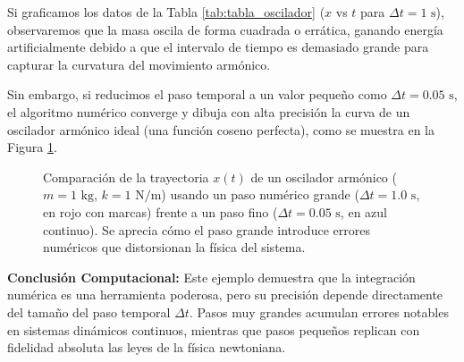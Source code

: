 \documentclass[11pt,a4paper]{book}
\begin{document}
Si graficamos los datos de la Tabla \ref{tab:tabla_oscilador} ($x$ vs $t$ para $\Delta t = 1 \text{ s}$), observaremos que la masa oscila de forma cuadrada o errática, ganando energía artificialmente debido a que el intervalo de tiempo es demasiado grande para capturar la curvatura del movimiento armónico. 

Sin embargo, si reducimos el paso temporal a un valor pequeño como $\Delta t = 0.05 \text{ s}$, el algoritmo numérico converge y dibuja con alta precisión la curva de un oscilador armónico ideal (una función coseno perfecta), como se muestra en la Figura \ref{fig:grafico_oscilador}.

\begin{figure}[htbp]
\centering
{}
\caption{Comparación de la trayectoria $x(t)$ de un oscilador armónico ($m=1\text{ kg}$, $k=1\text{ N/m}$) usando un paso numérico grande ($\Delta t = 1.0 \text{ s}$, en rojo con marcas) frente a un paso fino ($\Delta t = 0.05 \text{ s}$, en azul continuo). Se aprecia cómo el paso grande introduce errores numéricos que distorsionan la física del sistema.}
\label{fig:grafico_oscilador}
\end{figure}

\textbf{Conclusión Computacional:}
Este ejemplo demuestra que la integración numérica es una herramienta poderosa, pero su precisión depende directamente del tamaño del paso temporal $\Delta t$. Pasos muy grandes acumulan errores notables en sistemas dinámicos continuos, mientras que pasos pequeños replican con fidelidad absoluta las leyes de la física newtoniana.
\end{document}
